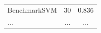 \documentclass[8pt,xcolor=table,aspectratio=169]{beamer}
\begin{document}
\begin{frame}
\begin{columns}[t]
\begin{column}[t]{0.4\textwidth}
\begin{figure}
\begin{table}
\begin{tabular}{l|c|c}
\rowcolor{benchmarkCol} BenchmarkSVM &        30 &  0.836  \\
                      ...           &       ... &  ...     \\

\end{tabular}
\end{table}
\end{figure}
\end{column}
\end{columns}
\end{frame}
\end{document}

